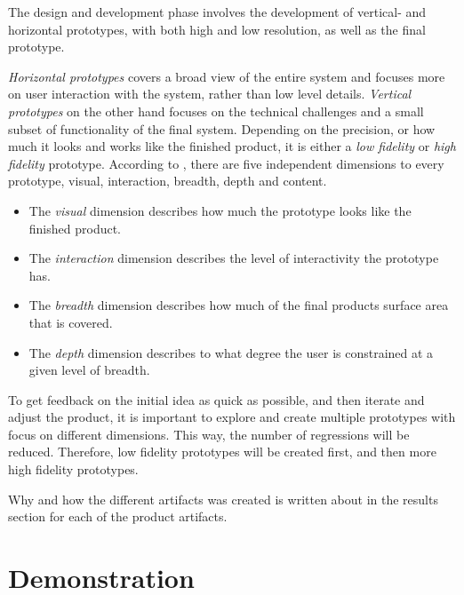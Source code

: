 \documentclass{report}
\begin{document}
The design and development phase involves the development of vertical- and horizontal prototypes, with both high and low resolution, as well as the final prototype. 

\textit{Horizontal prototypes} covers a broad view of the entire system and focuses more on user interaction with the system, rather than low level details. \textit{Vertical prototypes} on the other hand focuses on the technical challenges and a small subset of functionality of the final system. Depending on the precision, or how much it looks and works like the finished product, it is either a \textit{low fidelity} or \textit{high fidelity} prototype. According to \cite{prototype-dimensions}, there are five independent dimensions to every prototype, visual, interaction, breadth, depth and content.

\begin{itemize}
    \item The \textit{visual} dimension describes how much the prototype looks like the finished product. 
    
    \item The \textit{interaction} dimension describes the level of interactivity the prototype has. 
    
    \item The \textit{breadth} dimension describes how much of the final products surface area that is covered. 
    
    \item The \textit{depth} dimension describes to what degree the user is constrained at a given level of breadth.
\end{itemize}

To get feedback on the initial idea as quick as possible, and then iterate and adjust the product, it is important to explore and create multiple prototypes with focus on different dimensions. This way, the number of regressions will be reduced. Therefore, low fidelity prototypes will be created first, and then more high fidelity prototypes.

Why and how the different artifacts was created is written about in the results section for each of the product artifacts.

\section{Demonstration}
\end{document}
